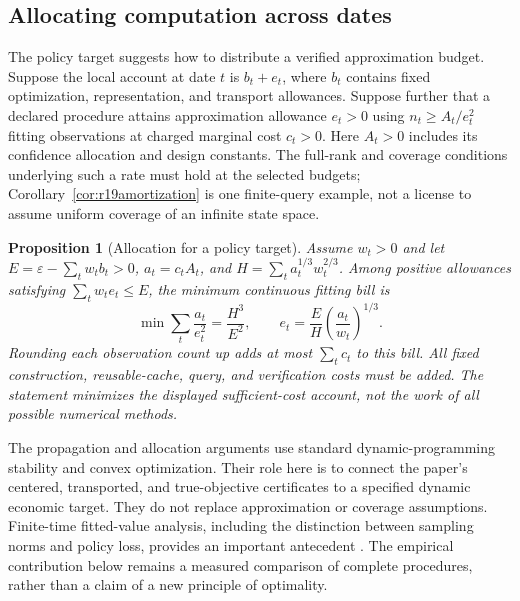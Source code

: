 \documentclass[ecta,nameyear,draft]{econsocart}
\newtheorem{proposition}[theorem]{Proposition}
\theoremstyle{definition}
\theoremstyle{remark}
\begin{document}
\subsection{Allocating computation across dates}
The policy target suggests how to distribute a verified approximation budget.
Suppose the local account at date $t$ is $b_t+e_t$, where $b_t$ contains
fixed optimization, representation, and transport allowances. Suppose further
that a declared procedure attains approximation allowance $e_t>0$ using
$n_t\geq A_t/e_t^2$ fitting observations at charged marginal cost $c_t>0$.
Here $A_t>0$ includes its confidence allocation and design constants. The
full-rank and coverage conditions underlying such a rate must hold at the
selected budgets; Corollary~\ref{cor:r19amortization} is one finite-query
example, not a license to assume uniform coverage of an infinite state space.

\begin{proposition}[Allocation for a policy target]\label{prop:r21allocation}
Assume $w_t>0$ and let
$E=\varepsilon-\sum_t w_tb_t>0$, $a_t=c_tA_t$, and
$H=\sum_ta_t^{1/3}w_t^{2/3}$. Among positive allowances satisfying
$\sum_tw_te_t\leq E$, the minimum continuous fitting bill is
\begin{equation}
 \min\sum_t\frac{a_t}{e_t^2}=\frac{H^3}{E^2},\qquad
 e_t=\frac{E}{H}\left(\frac{a_t}{w_t}\right)^{1/3}.
 \label{eq:r21allocation}
\end{equation}
Rounding each observation count up adds at most $\sum_tc_t$ to this bill.
All fixed construction, reusable-cache, query, and verification costs must
be added. The statement minimizes the displayed sufficient-cost account,
not the work of all possible numerical methods.
\end{proposition}

The propagation and allocation arguments use standard dynamic-programming
stability and convex optimization. Their role here is to connect the paper's
centered, transported, and true-objective certificates to a specified dynamic
economic target. They do not replace approximation or coverage assumptions.
Finite-time fitted-value analysis, including the distinction between sampling
norms and policy loss, provides an important antecedent
\citep{MunosSzepesvari2008}. The empirical contribution below remains a
measured comparison of complete procedures, rather than a claim of a new
principle of optimality.
\end{document}
